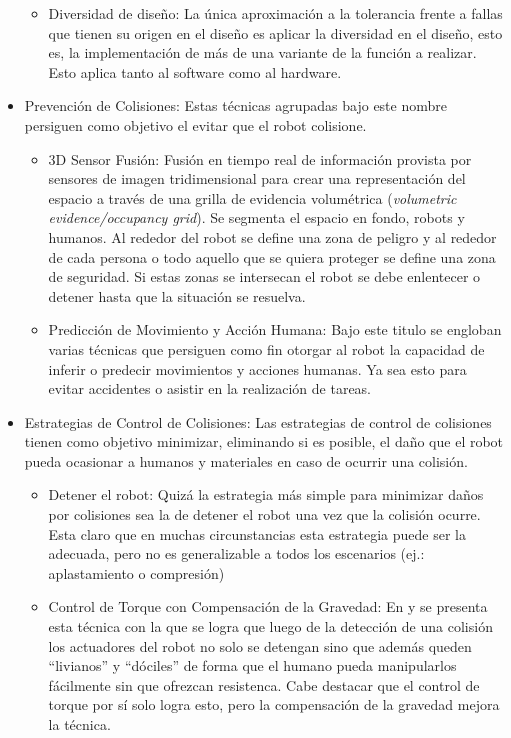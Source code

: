 \documentclass[withindex,glossary]{cam-thesis}
\begin{document}
\begin{itemize}
\begin{itemize}
		\item Diversidad de diseño: La única aproximación a la tolerancia frente a fallas que tienen su origen en el diseño es aplicar la diversidad en el diseño, esto es, la implementación de más de una variante de la función a realizar. Esto aplica tanto al software como al hardware. 
	\end{itemize}
\item Prevención de Colisiones:
  Estas técnicas agrupadas bajo este nombre persiguen como objetivo el evitar que el robot colisione.
  \begin{itemize}
  	\item 3D Sensor Fusión: Fusión en tiempo real de información provista por sensores de imagen tridimensional para crear una representación del espacio a través de una grilla de evidencia volumétrica (\textit{volumetric evidence/occupancy grid}). Se segmenta el espacio en fondo, robots y humanos. Al rededor del robot se define una zona de peligro y al rededor de cada persona o todo aquello que se quiera proteger se define una zona de seguridad. Si estas zonas se intersecan el robot se debe enlentecer o detener hasta que la situación se resuelva.
    \item Predicción de Movimiento y Acción Humana: Bajo este titulo se engloban varias técnicas que persiguen como fin otorgar al robot la capacidad de inferir o predecir movimientos y acciones humanas. Ya sea esto para evitar accidentes o asistir en la realización de tareas. 
  \end{itemize}
\item Estrategias de Control de Colisiones:
  Las estrategias de control de colisiones tienen como objetivo minimizar, eliminando si es posible, el daño que el robot pueda ocasionar a humanos y materiales en caso de ocurrir una colisión. 
  \begin{itemize}
    \item Detener el robot: Quizá la estrategia más simple para minimizar daños por colisiones sea la de detener el robot una vez que la colisión ocurre. Esta claro que en muchas circunstancias esta estrategia puede ser la adecuada, pero no es generalizable a todos los escenarios (ej.: aplastamiento o compresión) 
    \item Control de Torque con Compensación de la Gravedad: En \cite{haddadin2008collision} y \cite{Luca2007} se presenta esta técnica con la que se logra que luego de la detección de una colisión los actuadores del robot no solo se detengan sino que además queden ``livianos'' y ``dóciles'' de forma que el humano pueda manipularlos fácilmente sin que ofrezcan resistenca. Cabe destacar que el control de torque por sí solo logra esto, pero la compensación de la gravedad mejora la técnica.

\end{itemize}
\end{itemize}
\end{document}
